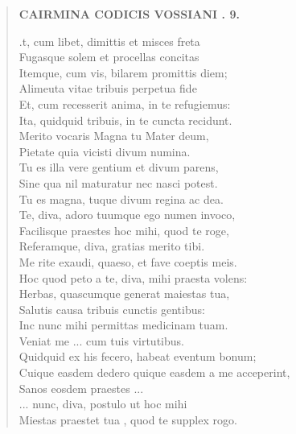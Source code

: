 \documentclass[11pt, a4paper]{report}
\begin{document}
\begin{verse}
    \begin{center} \textbf{CAIRMINA CODICIS VOSSIANI . 9.} \end{center} \marginpar{[27]} .t, cum libet, dimittis et misces freta \\ Fugasque solem et procellas concitas \\ Itemque, cum vis, bilarem promittis diem; \\ Alimeuta vitae tribuis perpetua fide \\ Et, cum recesserit anima, in te refugiemus: \\ Ita, quidquid tribuis, in te cuncta recidunt. \\ Merito vocaris Magna tu Mater deum, \\ Pietate quia vicisti divum numina. \\ Tu  \lbrack es \rbrack  illa vere gentium et divum parens, \\ Sine qua nil maturatur nec nasci potest. \\ Tu es magna, tuque divum regina  \lbrack ac \rbrack  dea. \\ Te, diva, adoro tuumque ego numen invoco, \\ Facilisque praestes hoc mihi, quod te roge, \\ Referamque, diva, gratias merito tibi. \\  \lbrack Me \rbrack  rite exaudi, quaeso, et fave coeptis meis. \\ Hoc quod peto a te, diva, mihi praesta volens: \\ Herbas, quascumque generat maiestas tua, \\ Salutis causa tribuis cunctis gentibus: \\ Inc  \lbrack nunc mihi permittas medicinam tuam. \\ Veniat me  \lbrack ... \rbrack  cum tuis virtutibus. \\ Quidquid ex his fecero, habeat eventum bonum; \\ Cuique easdem dedero quique easdem a me acceperint, \\ Sanos eosdem praestes  \lbrack ... \rbrack  \\  \lbrack ... \rbrack  nunc, diva, postulo ut hoc mihi \\ Miestas praestet  \lbrack tua \rbrack , quod te supplex rogo. \\ 
      \end{verse}
  
\end{document}
